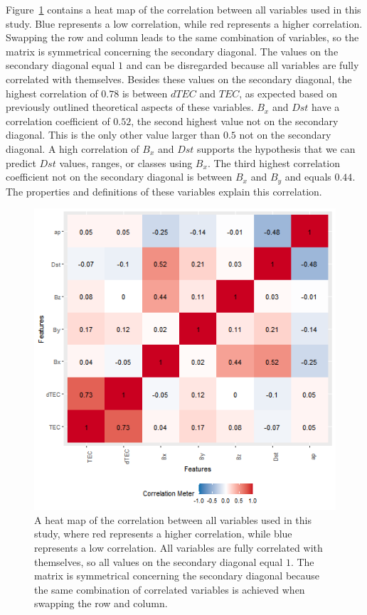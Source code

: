 \documentclass[sn-mathphys-num]{sn-jnl}%
\begin{document}
Figure~\ref{fig:correlation} contains a heat map of the correlation between all variables used in this study. Blue represents a low correlation, while red represents a higher correlation. Swapping the row and column leads to the same combination of variables, so the matrix is symmetrical concerning the secondary diagonal. The values on the secondary diagonal equal $1$ and can be disregarded because all variables are fully correlated with themselves. Besides these values on the secondary diagonal, the highest correlation of $0.78$ is between $dTEC$ and $TEC$, as expected based on previously outlined theoretical aspects of these variables. $B_{x}$ and $Dst$ have a correlation coefficient of $0.52$, the second highest value not on the secondary diagonal. This is the only other value larger than $0.5$ not on the secondary diagonal. A high correlation of $B_{x}$ and $Dst$ supports the hypothesis that we can predict $Dst$ values, ranges, or classes using $B_{x}$. The third highest correlation coefficient not on the secondary diagonal is between $B_{x}$ and $B_{y}$ and equals $0.44$. The properties and definitions of these variables explain this correlation.

\begin{figure}
 \centering
 \includegraphics[width=0.9\linewidth]{correlation.png}
    \caption{A heat map of the correlation between all variables used in this study, where red represents a higher correlation, while blue represents a low correlation. All variables are fully correlated with themselves, so all values on the secondary diagonal equal $1$. The matrix is symmetrical concerning the secondary diagonal because the same combination of correlated variables is achieved when swapping the row and column.}
    \label{fig:correlation}
\end{figure}
\end{document}
